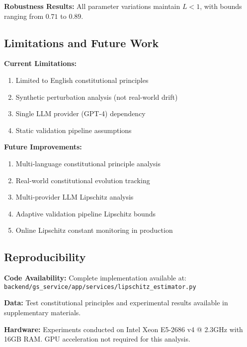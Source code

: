 \textbf{Robustness Results:}
All parameter variations maintain $L < 1$, with bounds ranging from $0.71$ to $0.89$.

\subsection{Limitations and Future Work}

\textbf{Current Limitations:}
\begin{enumerate}
    \item Limited to English constitutional principles
    \item Synthetic perturbation analysis (not real-world drift)
    \item Single LLM provider (GPT-4) dependency
    \item Static validation pipeline assumptions
\end{enumerate}

\textbf{Future Improvements:}
\begin{enumerate}
    \item Multi-language constitutional principle analysis
    \item Real-world constitutional evolution tracking
    \item Multi-provider LLM Lipschitz analysis
    \item Adaptive validation pipeline Lipschitz bounds
    \item Online Lipschitz constant monitoring in production
\end{enumerate}

\subsection{Reproducibility}

\textbf{Code Availability:}
Complete implementation available at: \texttt{backend/gs\_service/app/services/lipschitz\_estimator.py}

\textbf{Data:}
Test constitutional principles and experimental results available in supplementary materials.

\textbf{Hardware:}
Experiments conducted on Intel Xeon E5-2686 v4 @ 2.3GHz with 16GB RAM. GPU acceleration not required for this analysis.
